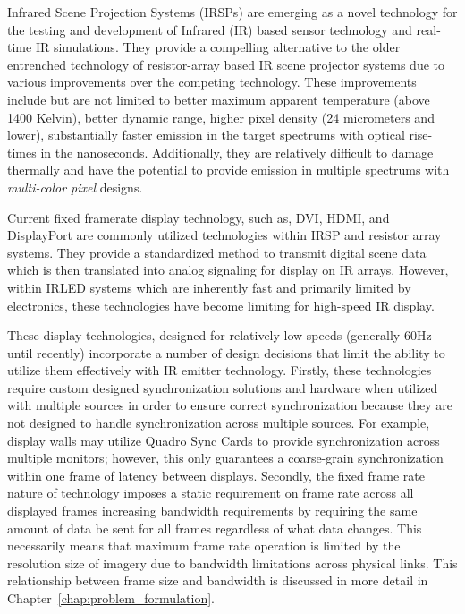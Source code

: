 \label{chap:introduction}

Infrared Scene Projection Systems (IRSPs) are emerging as a novel technology for the testing and development of Infrared (IR) based sensor technology and real-time IR simulations. They provide a compelling alternative to the older entrenched technology of resistor-array based IR scene projector systems\cite{pritchard1998design,williams2005history} due to various improvements over the competing technology. These improvements include but are not limited to better maximum apparent temperature (above 1400 Kelvin), better dynamic range, higher pixel density (24 micrometers and lower), substantially faster emission in the target spectrums with optical rise-times in the nanoseconds. Additionally, they are relatively difficult to damage thermally and have the potential to provide emission in multiple spectrums with \emph{multi-color pixel} designs.

Current fixed framerate display technology, such as, DVI\cite{DDWG1999}, HDMI\cite{HDMIForum2018}, and DisplayPort\cite{BhowmikEtAl2012} are commonly utilized technologies within IRSP and resistor array systems. They provide a standardized method to transmit digital scene data which is then translated into analog signaling for display on IR arrays. However, within IRLED systems which are inherently fast and primarily limited by electronics, these technologies have become limiting for high-speed IR display\cite{EjzakEtAl2016,LaVeignePrewarski2013}.

These display technologies, designed for relatively low-speeds (generally 60Hz until recently) incorporate a number of design decisions that limit the ability to utilize them effectively with IR emitter technology. Firstly, these technologies require custom designed synchronization solutions and hardware when utilized with multiple sources in order to ensure correct synchronization because they are not designed to handle synchronization across multiple sources. For example, display walls may utilize Quadro Sync Cards\cite{NVIDIAQuadroSync} to provide synchronization across multiple monitors; however, this only guarantees  a coarse-grain synchronization within one frame of latency between displays. Secondly, the fixed frame rate nature of technology imposes a static requirement on frame rate across all displayed frames increasing bandwidth requirements by requiring the same amount of data be sent for all frames regardless of what data changes. This necessarily means that maximum frame rate operation is limited by the resolution size of imagery due to bandwidth limitations across physical links. This relationship between frame size and bandwidth is discussed in more detail in Chapter~\ref{chap:problem_formulation}.

